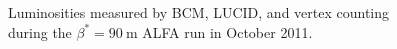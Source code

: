 \begin{figure}[h]
	\centering
	\caption{Luminosities measured by BCM, LUCID, and vertex counting during the $\beta^{*}=90~\mbox{m}$ ALFA run in October 2011.}
	\label{fig:reco-luminosity-alfa}
\end{figure}

\clearpage

